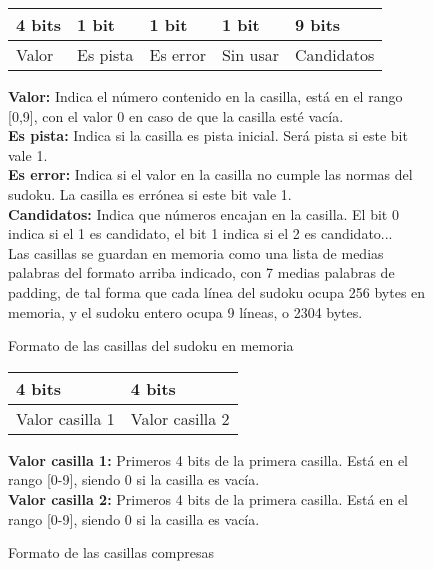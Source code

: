 \documentclass[12pt,letterpaper]{article}
\begin{document}
\begin{figure}
  \begin{center}
    \begin{tabular}{ | p{2cm} | p{2cm} | p{2cm} | p{2cm} | p{4cm} |} \hline
      4 bits & 1 bit    & 1 bit    & 1 bit    & 9 bits     \\\hline
      Valor  & Es pista & Es error & Sin usar & Candidatos \\\hline
    \end{tabular}
  \end{center}
  \textbf{Valor:} Indica el número contenido en la casilla, está en el
  rango [0,9], con el valor 0 en caso de que la casilla esté vacía.\\
  \textbf{Es pista:} Indica si la casilla es pista inicial. Será pista
  si este bit vale 1.\\
  \textbf{Es error:} Indica si el valor en la casilla no cumple las
  normas del sudoku. La casilla es errónea si este bit vale 1.\\
  \textbf{Candidatos:} Indica que números encajan en la casilla. El
  bit 0 indica si el 1 es candidato, el bit 1 indica si el 2 es
  candidato...\\
  Las casillas se guardan en memoria como una lista de medias palabras
  del formato arriba indicado, con 7 medias palabras de padding, de
  tal forma que cada línea del sudoku ocupa 256 bytes en memoria, y el
  sudoku entero ocupa 9 líneas, o 2304 bytes.
  \caption{Formato de las casillas del sudoku en memoria}
  \label{fig:formato-casilla}
\end{figure}

\begin{figure}
  \begin{center}
    \begin{tabular}{ | p{4cm} | p{4cm} | } \hline
      4 bits           & 4 bits          \\\hline
      Valor casilla 1  & Valor casilla 2 \\\hline
    \end{tabular}
  \end{center}
  \textbf{Valor casilla 1:} Primeros 4 bits de la primera
  casilla. Está en el rango [0-9], siendo 0 si la casilla es
  vacía. \\ 
  \textbf{Valor casilla 2:} Primeros 4 bits de la primera
  casilla. Está en el rango [0-9], siendo 0 si la casilla es vacía.
  \caption{Formato de las casillas compresas}
  \label{fig:formato-casilla-compreso}
\end{figure}
\end{document}
